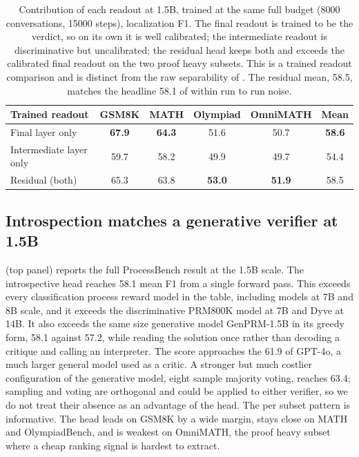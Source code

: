 \begin{table}[t]
  \centering
  \caption{Contribution of each readout at 1.5B, trained at the same full budget (8000 conversations, 15000 steps), localization F1. The final readout is trained to be the verdict, so on its own it is well calibrated; the intermediate readout is discriminative but uncalibrated; the residual head keeps both and exceeds the calibrated final readout on the two proof heavy subsets. This is a trained readout comparison and is distinct from the raw separability of . The residual mean, 58.5, matches the headline 58.1 of  within run to run noise.}
  \label{tab:ablation}
  \begin{tabular}{lccccc}
    \toprule
    Trained readout & GSM8K & MATH & Olympiad & OmniMATH & Mean \\
    \midrule
    Final layer only        & \textbf{67.9} & \textbf{64.3} & 51.6 & 50.7 & \textbf{58.6} \\
    Intermediate layer only & 59.7 & 58.2 & 49.9 & 49.7 & 54.4 \\
    Residual (both)         & 65.3 & 63.8 & \textbf{53.0} & \textbf{51.9} & 58.5 \\
    \bottomrule
  \end{tabular}
\end{table}

\subsection{Introspection matches a generative verifier at 1.5B}
\label{sec:exp-main}

 (top panel) reports the full ProcessBench result at the 1.5B scale. The introspective head reaches 58.1 mean F1 from a single forward pass. This exceeds every classification process reward model in the table, including models at 7B and 8B scale, and it exceeds the discriminative PRM800K model at 7B and Dyve at 14B. It also exceeds the same size generative model GenPRM-1.5B in its greedy form, 58.1 against 57.2, while reading the solution once rather than decoding a critique and calling an interpreter. The score approaches the 61.9 of GPT-4o, a much larger general model used as a critic. A stronger but much costlier configuration of the generative model, eight sample majority voting, reaches 63.4; sampling and voting are orthogonal and could be applied to either verifier, so we do not treat their absence as an advantage of the head. The per subset pattern is informative. The head leads on GSM8K by a wide margin, stays close on MATH and OlympiadBench, and is weakest on OmniMATH, the proof heavy subset where a cheap ranking signal is hardest to extract.

